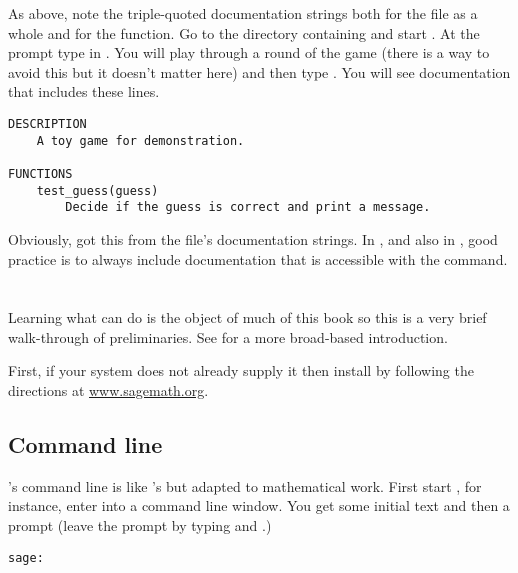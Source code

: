 As above, note the triple-quoted documentation strings both for the 
file as a whole and for the function.
Go to the directory containing  and start \python{}.
At the prompt type in .
You will play through a round of the game (there is a way to avoid this
but it doesn't matter here) and then type
.
You will see documentation that includes these lines.
\begin{lstlisting}
DESCRIPTION
    A toy game for demonstration.

FUNCTIONS
    test_guess(guess)
        Decide if the guess is correct and print a message. 
\end{lstlisting}
Obviously, \python{} got this from the file's documentation strings.
In \python{}, and also in \Sage, good practice is 
to always include documentation
that is accessible with the  command.




\section{\Sage}
Learning what \Sage{} can do is the object of much of this book 
so this is a very
brief walk-through of preliminaries.
See \citep{SageTeam12} for a more broad-based introduction.

First, if your system does not already supply it then install \Sage{} 
by following the directions at
\href{http://www.sagemath.org}{www.sagemath.org}.

\subsection{Command line}
\Sage's command line is like \python's but adapted to 
mathematical work.
First start \Sage,
for instance, enter  into a command line window.
You get some initial text and then a prompt
(leave the prompt by typing 
and .)
\begin{lstlisting}[style=python]
sage:  
\end{lstlisting}

